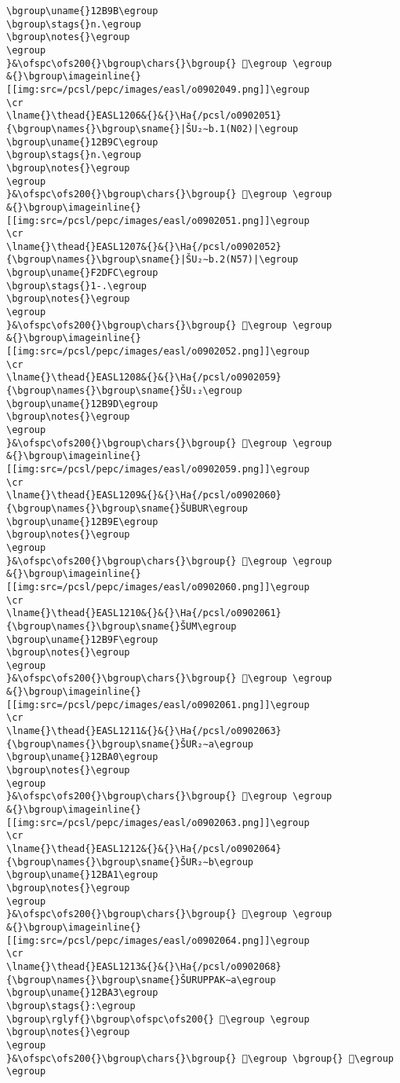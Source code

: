 \begin{verbatim}
\bgroup\uname{}12B9B\egroup
\bgroup\stags{}n.\egroup
\bgroup\notes{}\egroup
\egroup
}&\ofspc\ofs200{}\bgroup\chars{}\bgroup{} 𒮛\egroup \egroup
&{}\bgroup\imageinline{}[[img:src=/pcsl/pepc/images/easl/o0902049.png]]\egroup
\cr
\lname{}\thead{}EASL1206&{}&{}\Ha{/pcsl/o0902051}{\bgroup\names{}\bgroup\sname{}|ŠU₂∼b.1(N02)|\egroup
\bgroup\uname{}12B9C\egroup
\bgroup\stags{}n.\egroup
\bgroup\notes{}\egroup
\egroup
}&\ofspc\ofs200{}\bgroup\chars{}\bgroup{} 𒮜\egroup \egroup
&{}\bgroup\imageinline{}[[img:src=/pcsl/pepc/images/easl/o0902051.png]]\egroup
\cr
\lname{}\thead{}EASL1207&{}&{}\Ha{/pcsl/o0902052}{\bgroup\names{}\bgroup\sname{}|ŠU₂∼b.2(N57)|\egroup
\bgroup\uname{}F2DFC\egroup
\bgroup\stags{}1-.\egroup
\bgroup\notes{}\egroup
\egroup
}&\ofspc\ofs200{}\bgroup\chars{}\bgroup{} 󲷼\egroup \egroup
&{}\bgroup\imageinline{}[[img:src=/pcsl/pepc/images/easl/o0902052.png]]\egroup
\cr
\lname{}\thead{}EASL1208&{}&{}\Ha{/pcsl/o0902059}{\bgroup\names{}\bgroup\sname{}ŠU₁₂\egroup
\bgroup\uname{}12B9D\egroup
\bgroup\notes{}\egroup
\egroup
}&\ofspc\ofs200{}\bgroup\chars{}\bgroup{} 𒮝\egroup \egroup
&{}\bgroup\imageinline{}[[img:src=/pcsl/pepc/images/easl/o0902059.png]]\egroup
\cr
\lname{}\thead{}EASL1209&{}&{}\Ha{/pcsl/o0902060}{\bgroup\names{}\bgroup\sname{}ŠUBUR\egroup
\bgroup\uname{}12B9E\egroup
\bgroup\notes{}\egroup
\egroup
}&\ofspc\ofs200{}\bgroup\chars{}\bgroup{} 𒮞\egroup \egroup
&{}\bgroup\imageinline{}[[img:src=/pcsl/pepc/images/easl/o0902060.png]]\egroup
\cr
\lname{}\thead{}EASL1210&{}&{}\Ha{/pcsl/o0902061}{\bgroup\names{}\bgroup\sname{}ŠUM\egroup
\bgroup\uname{}12B9F\egroup
\bgroup\notes{}\egroup
\egroup
}&\ofspc\ofs200{}\bgroup\chars{}\bgroup{} 𒮟\egroup \egroup
&{}\bgroup\imageinline{}[[img:src=/pcsl/pepc/images/easl/o0902061.png]]\egroup
\cr
\lname{}\thead{}EASL1211&{}&{}\Ha{/pcsl/o0902063}{\bgroup\names{}\bgroup\sname{}ŠUR₂∼a\egroup
\bgroup\uname{}12BA0\egroup
\bgroup\notes{}\egroup
\egroup
}&\ofspc\ofs200{}\bgroup\chars{}\bgroup{} 𒮠\egroup \egroup
&{}\bgroup\imageinline{}[[img:src=/pcsl/pepc/images/easl/o0902063.png]]\egroup
\cr
\lname{}\thead{}EASL1212&{}&{}\Ha{/pcsl/o0902064}{\bgroup\names{}\bgroup\sname{}ŠUR₂∼b\egroup
\bgroup\uname{}12BA1\egroup
\bgroup\notes{}\egroup
\egroup
}&\ofspc\ofs200{}\bgroup\chars{}\bgroup{} 𒮡\egroup \egroup
&{}\bgroup\imageinline{}[[img:src=/pcsl/pepc/images/easl/o0902064.png]]\egroup
\cr
\lname{}\thead{}EASL1213&{}&{}\Ha{/pcsl/o0902068}{\bgroup\names{}\bgroup\sname{}ŠURUPPAK∼a\egroup
\bgroup\uname{}12BA3\egroup
\bgroup\stags{}:\egroup
\bgroup\rglyf{}\bgroup\ofspc\ofs200{} 𒮣\egroup \egroup
\bgroup\notes{}\egroup
\egroup
}&\ofspc\ofs200{}\bgroup\chars{}\bgroup{} 𒮢\egroup \bgroup{} 𒮣\egroup \egroup

\end{verbatim}
